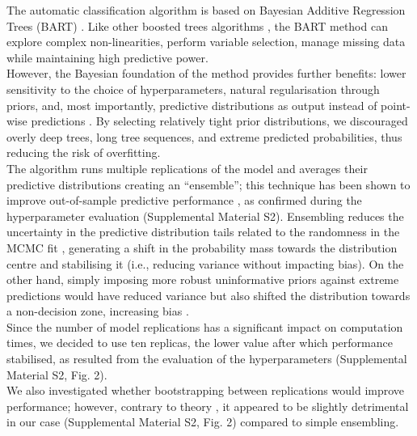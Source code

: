 \documentclass[]{bmcart}
\begin{document}
The automatic classification algorithm is based on Bayesian Additive
Regression Trees (BART)
\citep{chipman2010bart, kapelner2013bartmachine}. Like other boosted
trees algorithms \citep{hastie2009boosting}, the BART method can explore
complex non-linearities, perform variable selection, manage missing data
while maintaining high predictive power.\\
However, the Bayesian foundation of the method provides further
benefits: lower sensitivity to the choice of hyperparameters, natural
regularisation through priors, and, most importantly, predictive
distributions as output instead of point-wise predictions
\citep{soria2011belm, joo2020being, jospin2020hands}. By selecting
relatively tight prior distributions, we discouraged overly deep trees,
long tree sequences, and extreme predicted probabilities, thus reducing
the risk of overfitting.\\
The algorithm runs multiple replications of the model and averages their
predictive distributions creating an ``ensemble''; this technique has
been shown to improve out-of-sample predictive performance
\citep{zhou2021ensemble, dietterich2000ensemble}, as confirmed during
the hyperparameter evaluation (Supplemental Material S2). Ensembling
reduces the uncertainty in the predictive distribution tails related to
the randomness in the MCMC fit \citep{robert2004monte}, generating a
shift in the probability mass towards the distribution centre and
stabilising it (i.e., reducing variance without impacting bias). On the
other hand, simply imposing more robust uninformative priors against
extreme predictions would have reduced variance but also shifted the
distribution towards a non-decision zone, increasing bias
\citep{hansen2000bayesian}.\\
Since the number of model replications has a significant impact on
computation times, we decided to use ten replicas, the lower value after
which performance stabilised, as resulted from the evaluation of the
hyperparameters (Supplemental Material S2, Fig. 2).\\
We also investigated whether bootstrapping between replications
\citep{breiman1996bagging} would improve performance; however, contrary
to theory \citep{diez2015diversity}, it appeared to be slightly
detrimental in our case (Supplemental Material S2, Fig. 2) compared to
simple ensembling.\\
\end{document}
